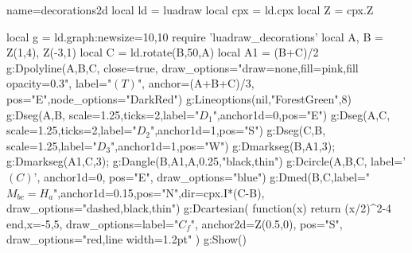 \begin{luadraw}{name=decorations2d}
local ld = luadraw
local cpx = ld.cpx
local Z = cpx.Z

local g = ld.graph:new{size={10,10}}
require 'luadraw_decorations'
local A, B = Z(1,4), Z(-3,1)
local C = ld.rotate(B,50,A)
local A1 = (B+C)/2
g:Dpolyline({A,B,C}, {close=true, draw_options="draw=none,fill=pink,fill opacity=0.3", 
    label="$(T)$", anchor=(A+B+C)/3, pos="E",node_options="DarkRed"})
g:Lineoptions(nil,"ForestGreen",8)
g:Dseg({A,B}, {scale=1.25,ticks=2,label="$D_1$",anchor1d=0,pos="E"})
g:Dseg({A,C}, {scale=1.25,ticks=2,label="$D_2$",anchor1d=1,pos="S"})
g:Dseg({C,B}, {scale=1.25,label="$D_3$",anchor1d=1,pos="W"})
g:Dmarkseg(B,A1,3); g:Dmarkseg(A1,C,3); g:Dangle(B,A1,A,0.25,"black,thin")
g:Dcircle({A,B,C}, {label='$(C)$', anchor1d=0, pos="E", draw_options="blue"})
g:Dmed(B,C,{label="$M_{bc}=H_a$",anchor1d=0.15,pos="N",dir=cpx.I*(C-B), draw_options="dashed,black,thin"})
g:Dcartesian( function(x) return (x/2)^2-4 end,{x={-5,5},
    draw_options={label="$C_f$", anchor2d=Z(0.5,0), pos="S", draw_options="red,line width=1.2pt"} })
g:Show()
\end{luadraw}
